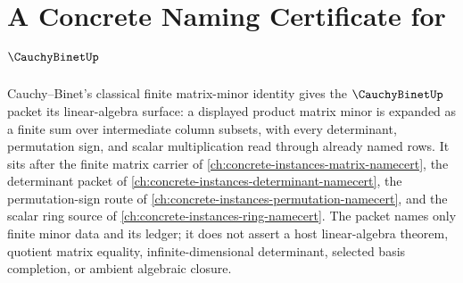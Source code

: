 \chapter{A Concrete Naming Certificate for $\CauchyBinetUp$}
\label{ch:concrete-instances-cauchy-binet-namecert}

Cauchy--Binet's classical finite matrix-minor identity gives the $\CauchyBinetUp$ packet its linear-algebra surface: a displayed product matrix minor is expanded as a finite sum over intermediate column subsets, with every determinant, permutation sign, and scalar multiplication read through already named rows. It sits after the finite matrix carrier of \autoref{ch:concrete-instances-matrix-namecert}, the determinant packet of \autoref{ch:concrete-instances-determinant-namecert}, the permutation-sign route of \autoref{ch:concrete-instances-permutation-namecert}, and the scalar ring source of \autoref{ch:concrete-instances-ring-namecert}. The packet names only finite minor data and its ledger; it does not assert a host linear-algebra theorem, quotient matrix equality, infinite-dimensional determinant, selected basis completion, or ambient algebraic closure.

